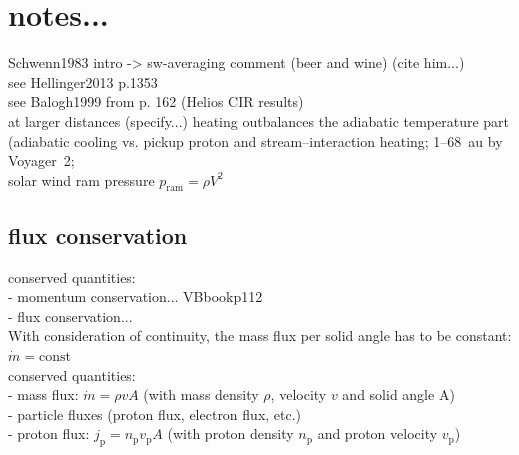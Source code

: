 \section{notes...}
Schwenn1983 intro -> sw-averaging comment (beer and wine) (cite him...)\\
see Hellinger2013 p.1353\\
see Balogh1999 from p. 162 (Helios CIR results)\\

at larger distances (specify...) heating outbalances the adiabatic temperature part (adiabatic cooling vs. pickup proton and stream--interaction heating; 1--68~au by Voyager~2; \citet{Richardson2003}\\
solar wind ram pressure $p_\text{ram} = \rho V^2$\\

\subsection{flux conservation}
conserved quantities:\\
- momentum conservation... VBbookp112\\
- flux conservation...\\



With consideration of continuity, the mass flux per solid angle has to be constant: $\dot{m} = \text{const}$\\
conserved quantities:\\
- mass flux: $\dot{m} = \rho v A$ (with mass density $\rho$, velocity $v$ and solid angle A)\\
- particle fluxes (proton flux, electron flux, etc.)\\
	- proton flux: $j_\text{p} = n_\text{p} v_\text{p} A$ (with proton density $n_\text{p}$ and proton velocity $v_\text{p}$)\\

